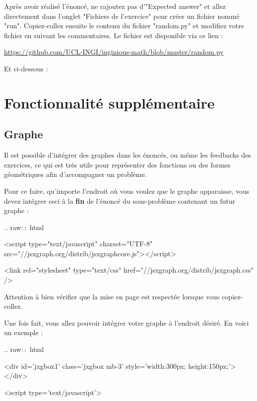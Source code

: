 \documentclass{article}
\begin{document}
Après avoir réalisé l'énoncé, ne rajoutez pas d'"Expected answer" et allez directement dans l'onglet "Fichiers de l'exercice" pour créer un fichier nommé "run". Copiez-collez ensuite le contenu du fichier "random.py" et modifiez votre fichier en suivant les commentaires. Le fichier est disponible via ce lien : 

\bigskip
\url{https://github.com/UCL-INGI/inginious-math/blob/master/random.py}
\bigskip

Et ci-dessous :

\newpage


\section{Fonctionnalité supplémentaire}

\subsection{Graphe}

Il est possible d'intégrer des graphes dans les énoncés, ou même les feedbacks des exercices, ce qui est très utile pour représenter des fonctions ou des formes géométriques afin d'accompagner un problème.
\bigskip

Pour ce faire, qu'importe l'endroit où vous voulez que le graphe apparaisse, vous devez intégrer ceci à la \textbf{fin} de l'énoncé du sous-problème contenant un futur graphe :
\bigskip

.. raw${::}$ html
\bigskip

\hspace{1cm}<script type="text/javascript" charset="UTF-8" src="//jsxgraph.org/distrib/jsxgraphcore.js"></script>

\hspace{1cm}<link rel="stylesheet" type="text/css" href="//jsxgraph.org/distrib/jsxgraph.css" />
\bigskip

Attention à bien vérifier que la mise en page est respectée lorsque vous copiez-collez.
\bigskip

Une fois fait, vous allez pouvoir intégrer votre graphe à l'endroit désiré. En voici un exemple :
\bigskip

.. raw${::}$ html
\bigskip

\hspace{1cm}<div id={\color{red}'jxgbox1'} class='jxgbox mb-3' style='width:300px; height:150px;'></div>

\hspace{1cm}<script type='text/javascript'>
\end{document}
